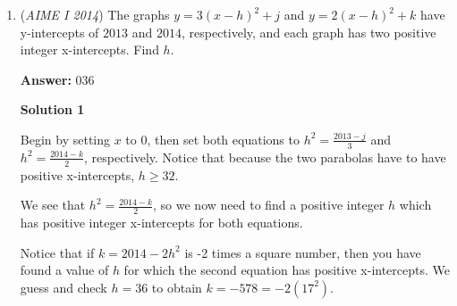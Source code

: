 \begin{enumerate}
By looking at the problem and drawing a few pictures, it quickly becomes obvious that one cannot draw a circle that covers $2$ disjoint areas of the $12$-gon without including all the vertices in between those areas. In other words, in order for a subset to be communal, all the vertices in the subset must be adjacent to one another. We now count the number of ways to select a row of adjacent vertices. We notice that for any subset size between $1$ and $11$, there are $12$ possible subsets like this (this is true because we can pick any of the $12$ vertices as a "starting" vertex, include some number of vertices counterclockwise from that vertex, and generate all possible configurations). However, we also have to include the set of all $12$ vertices, as well as the empty set. Thus, the total number is $12\cdot11 + 2 = \boxed{134}$.

 



\textbf{Solution 2}

There are $12$ possible choices for the starting vertex. We notice that the vertices we choose must be in a string and not disjoint. There are now $11$ choices for how long you want your string of vertices to be. We multiply $12$ by $11$. We also must add the empty set, as well as the set of all vertices, so we get our answer of $\boxed{134}$.~jamespudi

 


	\item (\textit{AIME I 2014}) The graphs $y = 3(x-h)^2 + j$ and $y = 2(x-h)^2 + k$ have y-intercepts of $2013$ and $2014$, respectively, and each graph has two positive integer x-intercepts. Find $h$.


 
 \textbf{Answer: }036



\textbf{Solution 1}

Begin by setting $x$ to 0, then set both equations to $h^2=\frac{2013-j}{3}$ and $h^2=\frac{2014-k}{2}$, respectively. Notice that because the two parabolas have to have positive x-intercepts, $h\ge32$.

 We see that $h^2=\frac{2014-k}{2}$, so we now need to find a positive integer $h$ which has positive integer x-intercepts for both equations.

 Notice that if $k=2014-2h^2$ is -2 times a square number, then you have found a value of $h$ for which the second equation has positive x-intercepts. We guess and check $h=36$ to obtain $k=-578=-2(17^2)$.


\end{enumerate}

